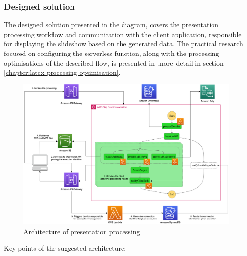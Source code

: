 \subsubsection{Designed solution}

The designed solution presented in the diagram, covers the presentation processing workflow and communication with the client application, responsible for displaying the slideshow based on the generated data.
The practical research focused on configuring the serverless function, along with the processing optimisations of the described flow, is presented in~more~detail in section \ref{chapter:latex-processing-optimisation}.

\begin{figure}[H]
   \centering
   \includegraphics[width=1\textwidth]{assets/04-serverless-for-web-apps/euclidArchitecture.png}
   \caption{Architecture of presentation processing}
   \label{fig:euclid-web-app}
\end{figure}

Key points of the suggested architecture:

